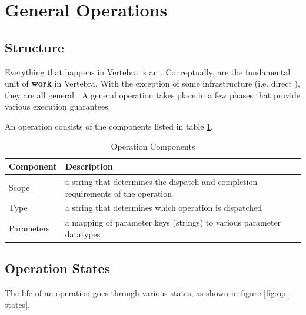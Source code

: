 \section{General Operations}


\subsection{Structure}

Everything that happens in Vertebra is an \operation{}.  Conceptually, \operations{} are the fundamental unit of \textbf{work} in Vertebra.  With the exception of some infrastructure (i.e. direct \operations{}), they are all general \operations{}.  A general operation takes place in a few phases that provide various execution guarantees.

An operation consists of the components listed in table \ref{tbl:op-parts}.

\begin{table}
        \begin{center}
                \begin{tabular}{|p{}|p{}|}
                        \hline \textbf{Component} & \textbf{Description} \\
                        \hline
                        \hline Scope      & a string that determines the dispatch and completion requirements of the operation \\
                        \hline Type       & a string that determines which operation is dispatched \\
                        \hline Parameters & a mapping of parameter keys (strings) to various parameter datatypes \\
                        \hline
                \end{tabular}
        \end{center}
        \caption{Operation Components}
        \label{tbl:op-parts}
\end{table}

\subsection{Operation States}

The life of an operation goes through various states, as shown in figure \ref{fig:op-states}.

